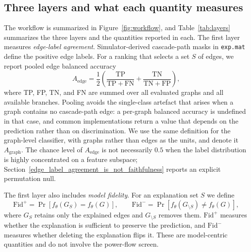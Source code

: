 \subsection{Three layers and what each quantity measures}\label{three_layer_evaluation}

The workflow is summarized in Figure~\ref{fig:workflow}, and Table~\ref{tab:layers} summarizes the three layers and the quantities reported in each. The first layer measures \emph{edge-label agreement}. Simulator-derived cascade-path masks in \texttt{exp.mat} define the positive edge labels. For a ranking that selects a set $S$ of edges, we report pooled edge balanced accuracy
\begin{equation}
A_{\mathrm{edge}}=\frac{1}{2}\left(\frac{\mathrm{TP}}{\mathrm{TP}+\mathrm{FN}}+\frac{\mathrm{TN}}{\mathrm{TN}+\mathrm{FP}}\right),
\label{eq:bacc}
\end{equation}
where TP, FP, TN, and FN are summed over all evaluated graphs and all available branches. Pooling avoids the single-class artefact that arises when a graph contains no cascade-path edge: a per-graph balanced accuracy is undefined in that case, and common implementations return a value that depends on the prediction rather than on discrimination. We use the same definition for the graph-level classifier, with graphs rather than edges as the units, and denote it $A_{\mathrm{graph}}$. The chance level of $A_{\mathrm{edge}}$ is not necessarily $0.5$ when the label distribution is highly concentrated on a feature subspace; Section~\ref{edge_label_agreement_is_not_faithfulness} reports an explicit permutation null.

The first layer also includes \emph{model fidelity}. For an explanation set $S$ we define
\begin{equation}
\mathrm{Fid}^{+}=\Pr\left[f_\theta(G_{S})=f_\theta(G)\right],\qquad
\mathrm{Fid}^{-}=\Pr\left[f_\theta(G_{\setminus S})\neq f_\theta(G)\right],
\label{eq:fidelity}
\end{equation}
where $G_S$ retains only the explained edges and $G_{\setminus S}$ removes them. $\mathrm{Fid}^{+}$ measures whether the explanation is sufficient to preserve the prediction, and $\mathrm{Fid}^{-}$ measures whether deleting the explanation flips it. These are model-centric quantities and do not involve the power-flow screen.

